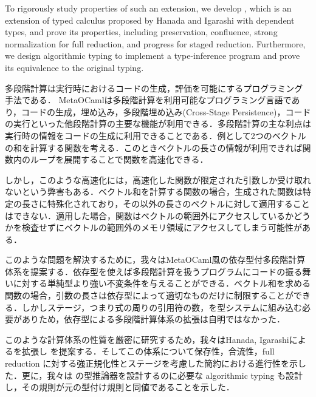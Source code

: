 \documentclass[master,english]{kuisthesis}
\begin{document}
\begin{eabstract}

To rigorously study properties of such an extension, we develop \LMD, which is
an extension of typed calculus \LTP proposed by Hanada and Igarashi with
dependent types, and prove its properties, including preservation,
confluence, strong normalization for full reduction, and progress for
staged reduction.  Furthermore, we design algorithmic typing to implement a
type-inference program and prove its equivalence to the original typing. 



\end{eabstract}

\begin{jabstract}				%
    多段階計算は実行時におけるコードの生成，評価を可能にするプログラミング手法である．
    MetaOCamlは多段階計算を利用可能なプログラミング言語であり，コードの生成，埋め込み，多段階埋め込み(Cross-Stage Persistence)，コードの実行といった他段階計算の主要な機能が利用できる．多段階計算の主な利点は実行時の情報をコードの生成に利用できることである．例として2つのベクトルの和を計算する関数を考える．このときベクトルの長さの情報が利用できれば関数内のループを展開することで関数を高速化できる．

    しかし，このような高速化には，高速化した関数が限定された引数しか受け取れないという弊害もある．ベクトル和を計算する関数の場合，生成された関数は特定の長さに特殊化されており，その以外の長さのベクトルに対して適用することはできない．適用した場合，関数はベクトルの範囲外にアクセスしているかどうかを検査せずにベクトルの範囲外のメモリ領域にアクセスしてしまう可能性がある．

    このような問題を解決するために，我々はMetaOCaml風の依存型付多段階計算体系を提案する．依存型を使えば多段階計算を扱うプログラムにコードの振る舞いに対する単純型より強い不変条件を与えることができる．ベクトル和を求める関数の場合，引数の長さは依存型によって適切なものだけに制限することができる．しかしステージ，つまり式の周りの引用符の数，を型システムに組み込む必要がありため，依存型による多段階計算体系の拡張は自明ではなかった．

    このような計算体系の性質を厳密に研究するため，我々はHanada, Igarashiによる\LTP を拡張し \LMD を提案する．そしてこの体系について保存性，合流性，full reduction に対する強正規化性とステージを考慮した簡約における進行性を示した．更に，我々は \LMD の型推論器を設計するのに必要な algorithmic typing も設計し，その規則が元の型付け規則と同値であることを示した．
\end{jabstract}
\end{document}
